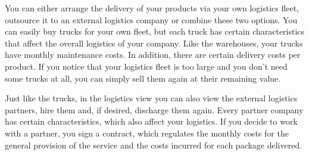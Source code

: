You can either arrange the delivery of your products via your own logistics fleet, outsource it to an external logistics company or combine these two options. You can easily buy trucks for your own fleet, but each truck has certain characteristics that affect the overall logistics of your company. Like the warehouses, your trucks have monthly maintenance costs. In addition, there are certain delivery costs per product. If you notice that your logistics fleet is too large and you don't need some trucks at all, you can simply sell them again at their remaining value.

Just like the trucks, in the logistics view you can also view the external logistics partners, hire them and, if desired, discharge them again. Every partner company has certain characteristics, which also affect your logistics. If you decide to work with a partner, you sign a contract, which regulates the monthly costs for the general provision of the service and the costs incurred for each package delivered. 
